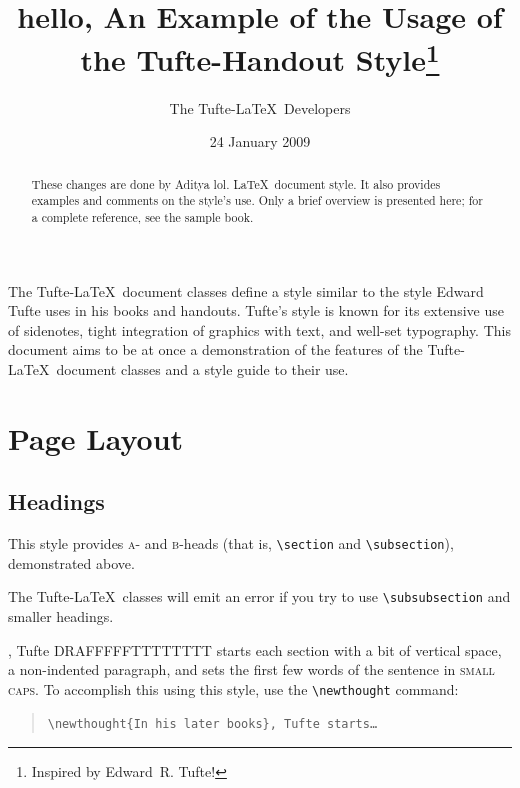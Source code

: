 \documentclass{tufte-handout}
\title{hello, An Example of the Usage of the Tufte-Handout Style\thanks{Inspired by Edward~R. Tufte!}}
\author[The Tufte-LaTeX Developers]{The Tufte-\LaTeX\ Developers}
\date{24 January 2009}  %
\newcommand{\doccmd}[1]{\texttt{\textbackslash#1}}%
\newenvironment{docspec}{\begin{quote}\noindent}{\end{quote}}%
\begin{document}
\maketitle%

\begin{abstract}
\noindent These changes are done by Aditya lol. \LaTeX\ document style.
It also provides examples and comments on the style's use.  Only a brief
overview is presented here; for a complete reference, see the sample book.
\end{abstract}


The Tufte-\LaTeX\ document classes define a style similar to the
style Edward Tufte uses in his books and handouts.  Tufte's style is known
for its extensive use of sidenotes, tight integration of graphics with
text, and well-set typography.  This document aims to be at once a
demonstration of the features of the Tufte-\LaTeX\ document classes
and a style guide to their use.

\section{Page Layout}\label{sec:page-layout}
\subsection{Headings}\label{sec:headings}
This style provides \textsc{a}- and \textsc{b}-heads (that is,
\Verb|\section| and \Verb|\subsection|), demonstrated above.

The Tufte-\LaTeX\ classes will emit an error if you try to use
\linebreak\Verb|\subsubsection| and smaller headings.

,\cite{Tufte2006} Tufte
DRAFFFFFTTTTTTTT starts each section with a bit of vertical space, a non-indented paragraph,
and sets the first few words of the sentence in \textsc{small caps}.  To
accomplish this using this style, use the \Verb|\newthought| command:  
\begin{docspec}
  \doccmd{newthought\{In his later books\}, Tufte starts\ldots}
\end{docspec}
\end{document}
